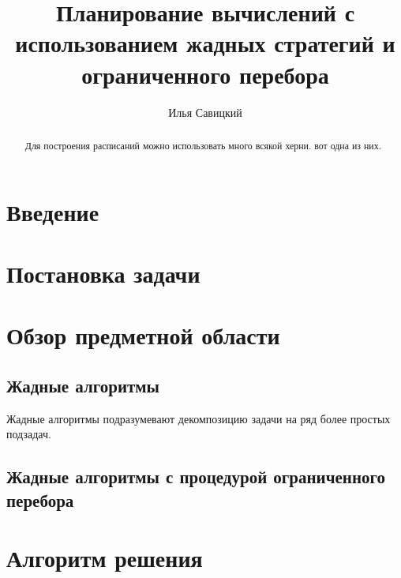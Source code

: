 \documentclass{article}
\author{Илья Савицкий}
\title{Планирование вычислений с использованием жадных стратегий и ограниченного перебора}
\begin{document}
\maketitle
\newpage
\begin{abstract}
    Для построения расписаний можно использовать много всякой херни. вот одна из них.
\end{abstract}
\newpage
\tableofcontents
\newpage
\section{Введение}

\section{Постановка задачи}

\section{Обзор предметной области}

\subsection{Жадные алгоритмы}
Жадные алгоритмы подразумевают декомпозицию задачи на ряд более простых подзадач.

\subsection{Жадные алгоритмы с процедурой ограниченного перебора}

\section{Алгоритм решения}
\end{document}
